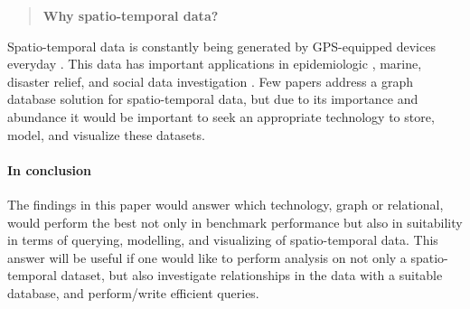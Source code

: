 \begin{quote}
    \textbf{Why spatio-temporal data?}
\end{quote}

Spatio-temporal data is constantly being generated by GPS-equipped devices everyday \cite{twitterdata}\cite{clost}. This data has important applications in epidemiologic \cite{spatiotemporal-epidemiology}, marine, disaster relief, and social data investigation \cite{rao2012spatiotemporal}. Few papers address a graph database solution for spatio-temporal data, but due to its importance and abundance it would be important to seek an appropriate technology to store, model, and visualize these datasets.

\paragraph{In conclusion} The findings in this paper would answer which technology, graph or relational, would perform the best not only in benchmark performance but also in suitability in terms of querying, modelling, and visualizing of spatio-temporal data. This answer will be useful if one would like to perform analysis on not only a spatio-temporal dataset, but also investigate relationships in the data with a suitable database, and perform/write efficient queries.